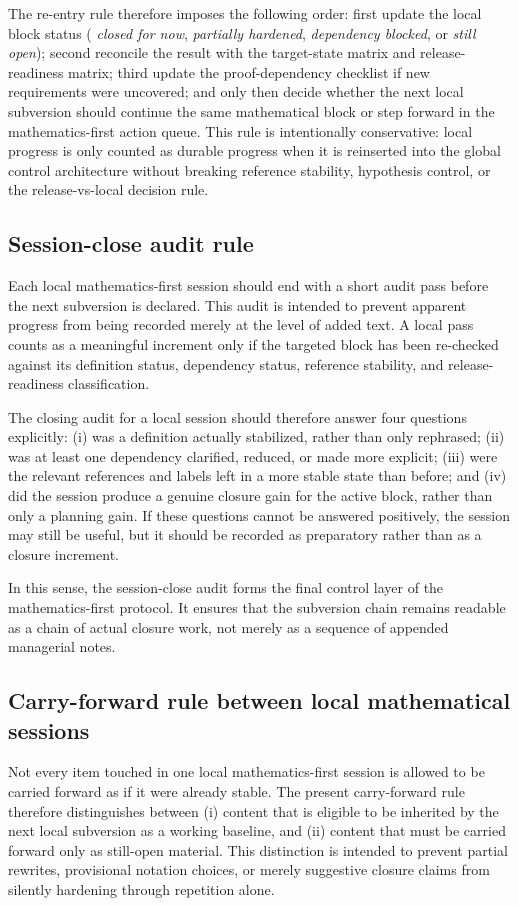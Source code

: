 \documentclass[12pt,a4paper]{article}
\begin{document}
The re-entry rule therefore imposes the following order: first update the local block status (
\emph{closed for now}, \emph{partially hardened}, \emph{dependency blocked}, or \emph{still open}); second reconcile the result with the target-state matrix and release-readiness matrix; third update the proof-dependency checklist if new requirements were uncovered; and only then decide whether the next local subversion should continue the same mathematical block or step forward in the mathematics-first action queue. This rule is intentionally conservative: local progress is only counted as durable progress when it is reinserted into the global control architecture without breaking reference stability, hypothesis control, or the release-vs-local decision rule.



\subsection*{Session-close audit rule}
Each local mathematics-first session should end with a short audit pass before the next subversion is declared. This audit is intended to prevent apparent progress from being recorded merely at the level of added text. A local pass counts as a meaningful increment only if the targeted block has been re-checked against its definition status, dependency status, reference stability, and release-readiness classification.

The closing audit for a local session should therefore answer four questions explicitly: (i) was a definition actually stabilized, rather than only rephrased; (ii) was at least one dependency clarified, reduced, or made more explicit; (iii) were the relevant references and labels left in a more stable state than before; and (iv) did the session produce a genuine closure gain for the active block, rather than only a planning gain. If these questions cannot be answered positively, the session may still be useful, but it should be recorded as preparatory rather than as a closure increment.

In this sense, the session-close audit forms the final control layer of the mathematics-first protocol. It ensures that the subversion chain remains readable as a chain of actual closure work, not merely as a sequence of appended managerial notes.


\subsection*{Carry-forward rule between local mathematical sessions}
Not every item touched in one local mathematics-first session is allowed to be carried forward as if it were already stable. The present carry-forward rule therefore distinguishes between (i) content that is eligible to be inherited by the next local subversion as a working baseline, and (ii) content that must be carried forward only as still-open material. This distinction is intended to prevent partial rewrites, provisional notation choices, or merely suggestive closure claims from silently hardening through repetition alone.
\end{document}
